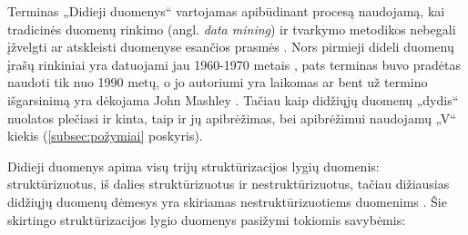 \documentclass{VUMIFPSkursinis}
\begin{document}
Terminas „Didieji duomenys“ vartojamas apibūdinant procesą naudojamą, kai tradicinės duomenų rinkimo (angl. \textit{data mining}) ir tvarkymo metodikos nebegali įžvelgti ar atskleisti duomenyse esančios prasmės \cite{bigdata}. Nors pirmieji dideli duomenų įrašų rinkiniai yra datuojami jau 1960-1970 metais \cite{first_bigdata}, pats terminas buvo pradėtas naudoti tik nuo 1990 metų, o jo autoriumi yra laikomas ar bent už termino išgarsinimą yra dėkojama John Mashley \cite{john_1, john_2, john_3}. Tačiau kaip didžiųjų duomenų „dydis“ nuolatos plečiasi ir kinta, taip ir jų apibrėžimas, bei apibrėžimui naudojamų „V“ kiekis (\ref{subsec:požymiai} poskyris).\par

Didieji duomenys apima visų trijų struktūrizacijos lygių duomenis: struktūrizuotus, iš dalies struktūrizuotus ir nestruktūrizuotus, tačiau dižiausias didžiųjų duomenų dėmesys yra skiriamas nestruktūrizuotiems duomenims \cite{bigdata_data_struct}. Šie skirtingo struktūrizacijos lygio duomenys pasižymi tokiomis savybėmis:
\end{document}
